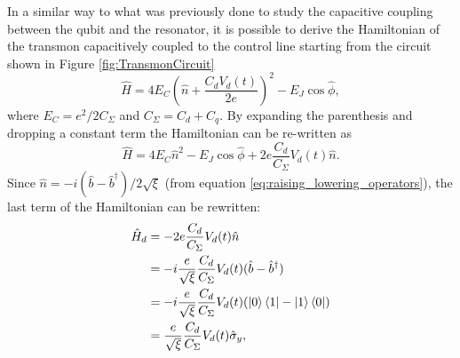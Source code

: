 In a similar way to what was previously done to study the capacitive coupling between the qubit and the resonator, it is possible to derive the Hamiltonian of the transmon capacitively coupled to the control line starting from the circuit shown in Figure \ref{fig:TransmonCircuit}
\begin{equation}
    \hat{H} = 4E_C \left(\hat{n} + \frac{C_d V_d(t)}{2e}\right)^2 - E_J \cos{\hat{\phi}},
\end{equation} 
where $E_C = e^2/2C_\Sigma$ and $C_\Sigma =  C_d + C_q$. By expanding the parenthesis and dropping a constant term the Hamiltonian can be re-written as
\begin{equation}\label{eq:tmp}
    \hat{H} =  4E_C\hat{n}^2 -E_J\cos{\hat{\phi}} + 2e\frac{C_d}{C_\Sigma}V_d(t)\hat{n}.
\end{equation}
Since $\hat{n} = -i(\hat{b}-\hat{b}^\dagger)/2\sqrt{\xi}$ (from equation \ref{eq:raising_lowering_operators}), the last term of the Hamiltonian can be rewritten:
\begin{align}\label{eq:misto}
    \hat{H}_d &= -2e\frac{C_d}{C_\Sigma}V_d(t)\hat{n}\\
    &=-i\frac{e}{\sqrt{\xi}}\frac{C_d}{C_{\Sigma}}V_d(t)(\hat{b}-\hat{b}^\dagger)\\
    &=-i\frac{e}{\sqrt{\xi}}\frac{C_d}{C_{\Sigma}}V_d(t)(\ket{0}\bra{1}-\ket{1}\bra{0})\\
    &=\frac{e}{\sqrt{\xi}}\frac{C_d}{C_{\Sigma}}V_d(t)\hat{\sigma}_y,
\end{align}

